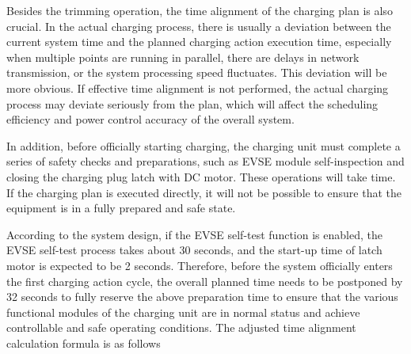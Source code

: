 \documentclass[
english,
ruledheaders=section,%
class=report,%
thesis={type=Report},%
accentcolor=9c,%
custommargins=true,%
marginpar=false,%
parskip=half-,%
fontsize=11pt,%
logofile={img/tuda_logo.pdf}, %
]{tudapub}
\begin{document}

    Besides the trimming operation, the time alignment of the charging plan is also crucial. In the actual charging process, there is usually a deviation between the current system time and the planned charging action execution time, especially when multiple points are running in parallel, there are delays in network transmission, or the system processing speed fluctuates. This deviation will be more obvious. If effective time alignment is not performed, the actual charging process may deviate seriously from the plan, which will affect the scheduling efficiency and power control accuracy of the overall system.


    In addition, before officially starting charging, the charging unit must complete a series of safety checks and preparations, such as EVSE module self-inspection and closing the charging plug latch with DC motor. These operations will take time. If the charging plan is executed directly, it will not be possible to ensure that the equipment is in a fully prepared and safe state.


    According to the system design, if the EVSE self-test function is enabled, the EVSE self-test process takes about 30 seconds, and the start-up time of latch motor is expected to be 2 seconds. Therefore, before the system officially enters the first charging action cycle, the overall planned time needs to be postponed by 32 seconds to fully reserve the above preparation time to ensure that the various functional modules of the charging unit are in normal status and achieve controllable and safe operating conditions. The adjusted time alignment calculation formula is as follows
\end{document}
